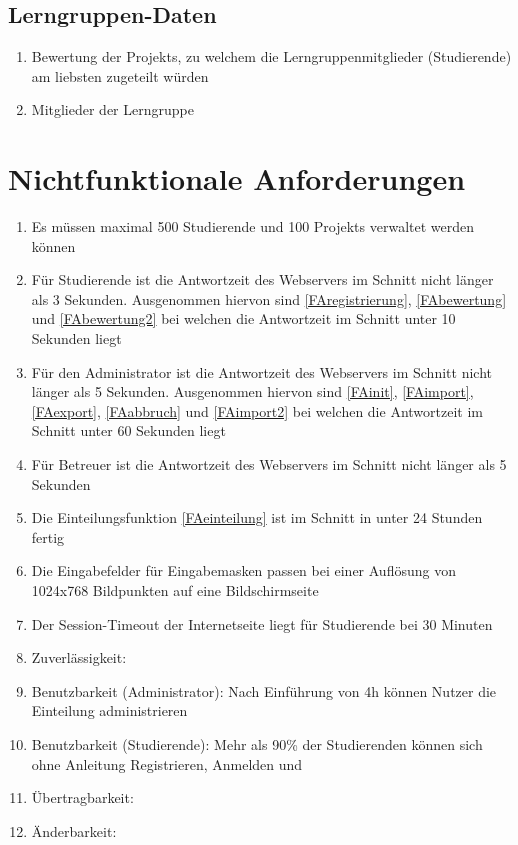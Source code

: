 \documentclass[parskip=full]{scrartcl}
\newcommand{\swtLabel}[1]{\textbf{/#1\arabic*0/}}
\begin{document}
\subsection{Lerngruppen-Daten} 
\begin{enumerate}[label=\swtLabel{D}, resume] 
  \item Bewertung der \glspl{Projekt}, zu welchem die Lerngruppenmitglieder
  (Studierende) am liebsten zugeteilt würden
  \item Mitglieder der Lerngruppe
\end{enumerate}

\section{Nichtfunktionale Anforderungen}

\begin{enumerate}[label=\swtLabel{NF}]
  \item Es müssen maximal 500 Studierende und 100 \glspl{Projekt} verwaltet werden
  können
  \item Für Studierende ist die Antwortzeit des Webservers im Schnitt nicht
  länger als 3 Sekunden. Ausgenommen hiervon sind \ref{FAregistrierung}, 
  \ref{FAbewertung} und \ref{FAbewertung2} bei welchen die Antwortzeit im
  Schnitt unter 10 Sekunden liegt
  \item Für den Administrator ist die Antwortzeit des Webservers im Schnitt nicht
  länger als 5 Sekunden. Ausgenommen hiervon sind \ref{FAinit}, \ref{FAimport},
  \ref{FAexport}, \ref{FAabbruch} und \ref{FAimport2} bei welchen die Antwortzeit im Schnitt
  unter 60 Sekunden liegt
  \item Für Betreuer ist die Antwortzeit des Webservers im Schnitt nicht
  länger als 5 Sekunden
  \item Die Einteilungsfunktion \ref{FAeinteilung} ist im Schnitt in unter 24
  Stunden fertig
  \item Die Eingabefelder für Eingabemasken passen bei einer Auflösung von 
	1024x768 Bildpunkten auf eine Bildschirmseite
	\item Der Session-Timeout der Internetseite liegt für Studierende bei 30
	Minuten
	\item Zuverlässigkeit:  %
	\item Benutzbarkeit (Administrator): Nach Einführung von 4h können Nutzer die
	Einteilung administrieren
	\item Benutzbarkeit (Studierende): Mehr als 90\% der Studierenden können
	sich ohne Anleitung Registrieren, Anmelden und %
	\item Übertragbarkeit: %
	\item Änderbarkeit: %
	
 

\end{enumerate}
\end{document}
